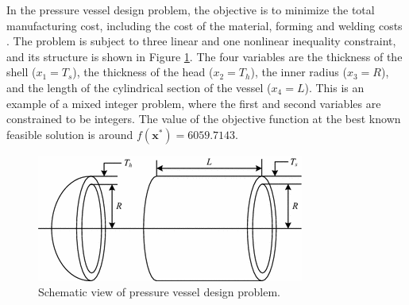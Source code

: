

In the pressure vessel design problem, the objective is to minimize the total manufacturing cost, including the cost of the material, forming and welding costs \cite{PV}. The problem is subject to three linear and one nonlinear inequality constraint, and its structure is shown in Figure \ref{fig:PV}. The four variables are the thickness of the shell ($x_1 = T_s$), the thickness of the head ($x_2 = T_h$), the inner radius ($x_3 = R$), and the length of the cylindrical section of the vessel ($x_4 = L$). This is an example of a mixed integer problem, where the first and second variables are constrained to be integers. The value of the objective function at the best known feasible solution is around $f(\bm{x}^*) = 6059.7143$. %


%

\vspace{0.5cm}

\begin{figure}[h]
    \begin{center}
    \includegraphics[scale=0.4]{img/Problems/PV.png}
    \end{center}
    \captionsetup{justification=centering}
    \caption{Schematic view of pressure vessel design problem.}\label{fig:PV}
\end{figure}
